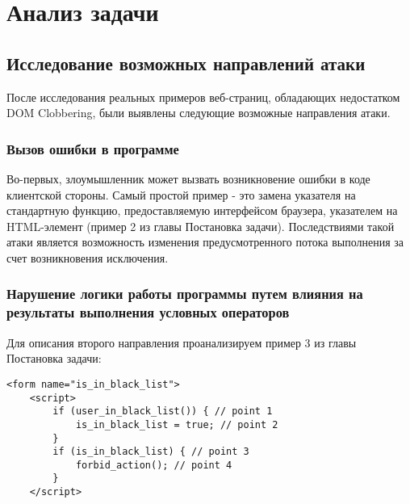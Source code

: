 
\chapter{Анализ задачи}\label{Analysis}

\section{Исследование возможных направлений атаки}

После исследования реальных примеров веб-страниц, обладающих недостатком DOM Clobbering, были выявлены следующие возможные направления атаки.
\bigskip

\subsection{Вызов ошибки в программе}
Во-первых, злоумышленник может вызвать возникновение ошибки в коде клиентской стороны. Самый простой пример - это замена указателя на стандартную функцию, предоставляемую интерфейсом браузера, указателем на HTML-элемент (пример 2 из главы Постановка задачи). Последствиями такой атаки является возможность изменения предусмотренного потока выполнения за счет возникновения исключения.


\subsection{Нарушение логики работы программы путем влияния на результаты выполнения условных операторов}
Для описания второго направления проанализируем пример 3 из главы Постановка задачи:

\begin{lstlisting}[caption=обход логики программы]
	<form name="is_in_black_list">
	<script>
		if (user_in_black_list()) { // point 1
			is_in_black_list = true; // point 2
		}
		if (is_in_black_list) { // point 3
			forbid_action(); // point 4
		}
	</script>
\end{lstlisting}
\bigskip

